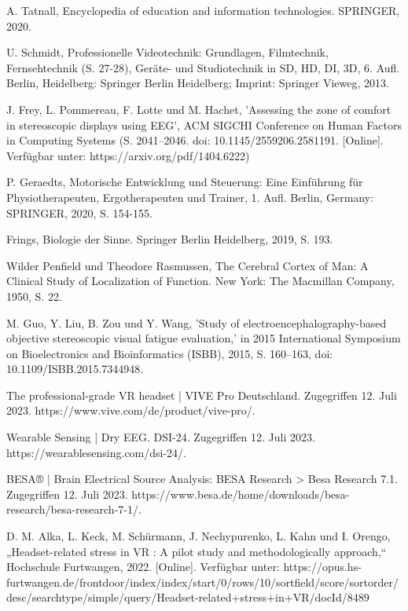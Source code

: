 \documentclass[conference]{IEEEtran}
\begin{document}
\begin{thebibliography}{00}
 A. Tatnall, Encyclopedia of education and information technologies. SPRINGER, 2020.

 U. Schmidt, Professionelle Videotechnik: Grundlagen, Filmtechnik, Fernsehtechnik (S. 27-28), Geräte- und Studiotechnik in SD, HD, DI, 3D, 6. Aufl. Berlin, Heidelberg: Springer Berlin Heidelberg; Imprint: Springer Vieweg, 2013.

 J. Frey, L. Pommereau, F. Lotte und M. Hachet, 'Assessing the zone of comfort in stereoscopic displays using EEG', ACM SIGCHI Conference on Human Factors in Computing Systems (S. 2041–2046. doi: 10.1145/2559206.2581191. [Online]. Verfügbar unter: https://arxiv.org/pdf/1404.6222)

 P. Geraedts, Motorische Entwicklung und Steuerung: Eine Einführung für Physiotherapeuten, Ergotherapeuten und Trainer, 1. Aufl. Berlin, Germany: SPRINGER, 2020, S. 154-155.

 Frings, Biologie der Sinne. Springer Berlin Heidelberg, 2019, S. 193.

 Wilder Penfield und Theodore Rasmussen, The Cerebral Cortex of Man: A Clinical Study of Localization of Function. New York: The Macmillan Company, 1950, S. 22.

 M. Guo, Y. Liu, B. Zou und Y. Wang, 'Study of electroencephalography-based objective stereoscopic visual fatigue evaluation,' in 2015 International Symposium on Bioelectronics and Bioinformatics (ISBB), 2015, S. 160–163, doi: 10.1109/ISBB.2015.7344948.

The professional-grade VR headset | VIVE Pro Deutschland. Zugegriffen 12. Juli 2023. https://www.vive.com/de/product/vive-pro/.

Wearable Sensing | Dry EEG. DSI-24. Zugegriffen 12. Juli 2023. https://wearablesensing.com/dsi-24/.

BESA® | Brain Electrical Source Analysis: BESA Research > Besa Research 7.1. Zugegriffen 12. Juli 2023. https://www.besa.de/home/downloads/besa-research/besa-research-7-1/.


D. M. Alka, L. Keck, M. Schürmann, J. Nechypurenko, L. Kahn und I. Orengo, „Headset-related stress in VR : A pilot study and methodologically approach,“ Hochschule Furtwangen, 2022. [Online]. Verfügbar unter: https://opus.hs-furtwangen.de/frontdoor/index/index/start/0/rows/10/sortfield/score/sortorder/desc/searchtype/simple/query/Headset-related+stress+in+VR/docId/8489

\end{thebibliography}
\end{document}

